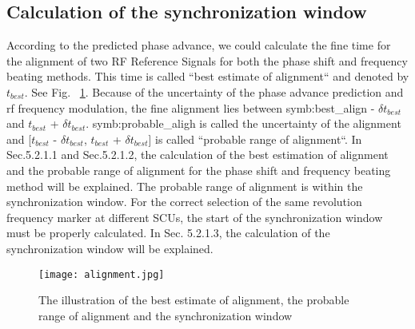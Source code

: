 \subsection{Calculation of the synchronization window}
According to the predicted phase advance, we could calculate the fine time for the alignment of two RF Reference Signals for both the phase shift and frequency beating methods. This time is called ``best estimate of alignment`` and denoted by $t_{best}$. See Fig. ~\ref{alignment}. Because of the uncertainty of the phase advance prediction and rf frequency modulation, the fine alignment lies between \gls{symb:best_align} - $\delta t_{best}$ and $t_{best}$ + $\delta t_{best}$. \gls{symb:probable_aligh} is called the uncertainty of the alignment and [$t_{best}$ - $\delta t_{best}$, $t_{best}$ + $\delta t_{best}$] is called ``probable range of alignment``. In Sec.5.2.1.1 and Sec.5.2.1.2, the calculation of the best estimation of alignment and the probable range of alignment for the phase shift and frequency beating method will be explained. The probable range of alignment is within the synchronization window. For the correct selection of the same revolution frequency marker at different SCUs, the start of the synchronization  window must be properly calculated. In Sec. 5.2.1.3, the calculation of the synchronization window will be explained. 
\begin{figure}[!htb]
   \centering   
   \texttt{[image: alignment.jpg]}
   \caption{The illustration of the best estimate of alignment, the probable range of alignment and the synchronization window}
   \label{alignment}
\end{figure}


